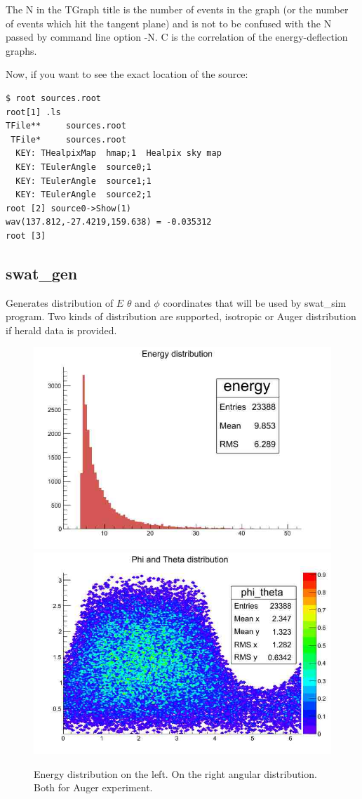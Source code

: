 \documentclass[12pt]{article}
\begin{document}
The N in the TGraph title is the number of events in the graph (or the number of 
events which hit the tangent plane) and is not to be confused with the N passed by command line
option -N. C is the correlation of the energy-deflection graphs.

Now, if you want to see the exact location of the source:
{\bf \color{brown}
\begin{lstlisting}
$ root sources.root
root[1] .ls
TFile**		sources.root	
 TFile*		sources.root	
  KEY: THealpixMap	hmap;1	Healpix sky map
  KEY: TEulerAngle	source0;1	
  KEY: TEulerAngle	source1;1	
  KEY: TEulerAngle	source2;1	
root [2] source0->Show(1)
wav(137.812,-27.4219,159.638) = -0.035312
root [3] 
\end{lstlisting}
}
\subsection{swat\_gen}
Generates distribution of $E$ $\theta$ and $\phi$ coordinates that
will be used by swat\_sim program. Two kinds of distribution are
supported, isotropic or Auger distribution if herald data is provided.
\begin{figure}[ht]
   \centering
      \includegraphics[scale=0.25]{energy.jpg}
      \includegraphics[scale=0.25]{phi_theta.jpg}
   \caption{Energy distribution on the left. On the right
   angular distribution. Both for Auger experiment.}
   \label{healpix}
\end{figure}
\end{document}
